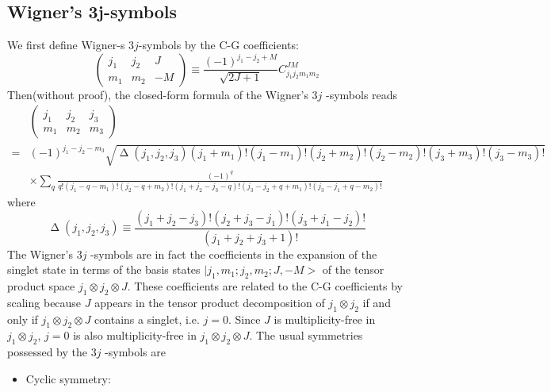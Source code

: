 \documentclass{article}
\begin{document}
	\subsection{Wigner’s 3j-symbols}
	
	We first define Wigner-s $3j$-symbols by the C-G coefficients:
	\begin{equation*}
		\begin{pmatrix}
			j_{1} & j_{2} & J\\
			m_{1} & m_{2} & -M
		\end{pmatrix} \equiv \frac{( -1)^{j_{1} -j_{2} +M}}{\sqrt{2J+1}} C_{j_{1} j_{2} m_{1} m_{2}}^{JM}
	\end{equation*}
	Then(without proof), the closed-form formula of the Wigner's $3j$ -symbols reads
	\begin{equation*}
		\begin{aligned}
			& \left(\begin{matrix}
				j_{1} & j_{2} & j_{3}\\
				m_{1} & m_{2} & m_{3}
			\end{matrix}\right)\\
			= & (-1)^{j_{1} -j_{2} -m_{3}}\sqrt{\upDelta ( j_{1} ,j_{2} ,j_{3})( j_{1} +m_{1}) !( j_{1} -m_{1}) !( j_{2} +m_{2}) !( j_{2} -m_{2}) !( j_{3} +m_{3}) !( j_{3} -m_{3}) !}\\
			& \times \sum _{q}\frac{(-1)^{q}}{q!( j_{1} -q-m_{1}) !( j_{2} -q+m_{2}) !( j_{1} +j_{2} -j_{3} -q) !( j_{3} -j_{2} +q+m_{1}) !( j_{3} -j_{1} +q-m_{2}) !}
		\end{aligned}
	\end{equation*}
	where
	\begin{equation*}
		\upDelta ( j_{1} ,j_{2} ,j_{3}) \equiv \frac{( j_{1} +j_{2} -j_{3}) !( j_{2} +j_{3} -j_{1}) !( j_{3} +j_{1} -j_{2}) !}{( j_{1} +j_{2} +j_{3} +1) !}
	\end{equation*}
	The Wigner's $3j$ -symbols are in fact the coefficients in the expansion of the singlet state in terms of the basis states $| j_{1} ,m_{1} ;j_{2} ,m_{2} ;J,-M> $ of the tensor product space $j_{1} \otimes j_{2} \otimes J$. These coefficients are related to the C-G coefficients by scaling because $J$ appears in the tensor product decomposition of $j_{1} \otimes j_{2}$ if and only if $j_{1} \otimes j_{2} \otimes J$ contains a singlet, i.e. $j=0$. Since $J$ is multiplicity-free in $j_{1} \otimes j_{2}$, $j=0$ is also multiplicity-free in $j_{1} \otimes j_{2} \otimes J$. The usual symmetries possessed by the $3j$ -symbols are
	\begin{itemize}
		\item Cyclic symmetry:
	\end{itemize}
\end{document}
